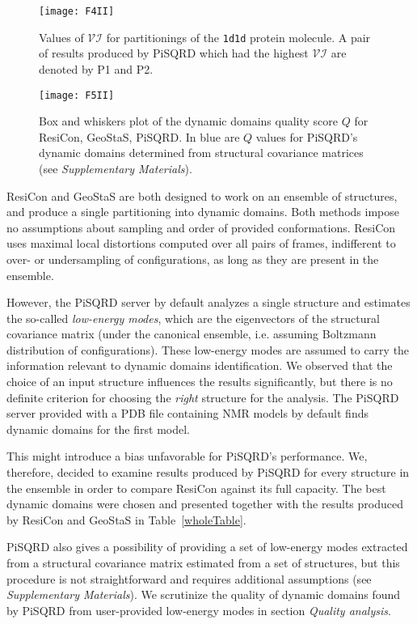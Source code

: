 \documentclass[a4paper,11pt,twoside]{book}%
\begin{document}
\begin{figure}
\centering
\texttt{[image: F4II]}
\caption{Values of $\mathcal{VI}$ for partitionings of the \texttt{1d1d} protein molecule.
A pair of results produced by PiSQRD which had the highest $\mathcal{VI}$ are denoted by P1 and P2.}
\label{comparison}
\end{figure}

\begin{figure*}
\centering
\texttt{[image: F5II]}
\caption{Box and whiskers plot of the dynamic domains quality score $Q$ for ResiCon, GeoStaS, PiSQRD.
In blue are $Q$ values for PiSQRD's dynamic domains determined from structural covariance matrices (see \emph{Supplementary Materials}).}
\label{boxWhiskers}
\end{figure*}

ResiCon and GeoStaS are both designed to work on an ensemble of structures, and produce a single partitioning into dynamic domains.
Both methods impose no assumptions about sampling and order of provided conformations.
ResiCon uses maximal local distortions computed over all pairs of frames, indifferent to over- or undersampling of configurations, as long as they are present in the ensemble.

However, the PiSQRD server by default analyzes a single structure and estimates the so-called \emph{low-energy modes}, which are the eigenvectors of the structural covariance matrix (under the canonical ensemble, i.e. assuming Boltzmann distribution of configurations).
These low-energy modes are assumed to carry the information relevant to dynamic domains identification.
We observed that the choice of an input structure influences the results significantly, but there is no definite criterion for choosing the \emph{right} structure for the analysis.
The PiSQRD server provided with a PDB file containing NMR models by default finds dynamic domains for the first model.

This might introduce a bias unfavorable for PiSQRD's performance. 
We, therefore, decided to examine results produced by PiSQRD for every structure in the ensemble in order to compare ResiCon against its full capacity.
The best dynamic domains were chosen and presented together with the results produced by ResiCon and GeoStaS in Table~\ref{wholeTable}.

PiSQRD also gives a possibility of providing a set of low-energy modes extracted from a structural covariance matrix estimated from a set of structures, but this procedure is not straightforward and requires additional assumptions (see \emph{Supplementary Materials}).
We scrutinize the quality of dynamic domains found by PiSQRD from user-provided low-energy modes in section \emph{Quality analysis}.
\end{document}
